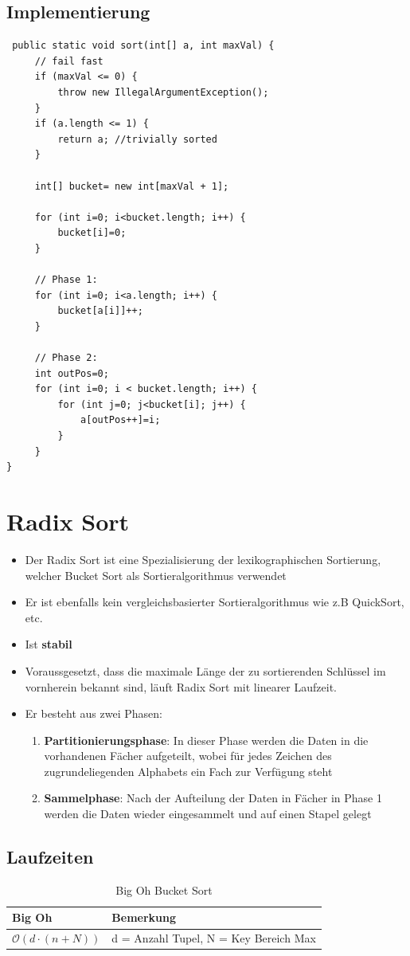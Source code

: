 \subsection{Implementierung}
\begin{lstlisting}
 public static void sort(int[] a, int maxVal) {
	 // fail fast
	 if (maxVal <= 0) {
		 throw new IllegalArgumentException();
	 }
	 if (a.length <= 1) {
		 return a; //trivially sorted
	 }
 
	 int[] bucket= new int[maxVal + 1];
	
	 for (int i=0; i<bucket.length; i++) {
		 bucket[i]=0;
	 }
	
	 // Phase 1:
	 for (int i=0; i<a.length; i++) {
		 bucket[a[i]]++;
	 }
	
	 // Phase 2: 
	 int outPos=0;
	 for (int i=0; i < bucket.length; i++) {
		 for (int j=0; j<bucket[i]; j++) {
			 a[outPos++]=i;
		 }
	 }
}
\end{lstlisting}

\clearpage


\section{Radix Sort}
\begin{itemize}
	\item Der Radix Sort ist eine Spezialisierung der lexikographischen Sortierung, welcher Bucket Sort als Sortieralgorithmus verwendet
	\item Er ist ebenfalls kein vergleichsbasierter Sortieralgorithmus wie z.B QuickSort, etc.
	\item Ist \textbf{stabil}
	\item Voraussgesetzt, dass die maximale Länge der zu sortierenden Schlüssel im vornherein bekannt sind, läuft Radix Sort mit linearer Laufzeit.
	\item Er besteht aus zwei Phasen:
	\begin{enumerate}
		\item \textbf{Partitionierungsphase}: In dieser Phase werden die Daten in die vorhandenen Fächer aufgeteilt, wobei für jedes Zeichen des zugrundeliegenden Alphabets ein Fach zur Verfügung steht
		\item \textbf{Sammelphase}: Nach der Aufteilung der Daten in Fächer in Phase 1 werden die Daten wieder eingesammelt und auf einen Stapel gelegt
	\end{enumerate}
\end{itemize}

\subsection{Laufzeiten}
\begin{table}[h]
	\centering
	\begin{tabu} to \linewidth {l l}
		\toprule
		Big Oh & Bemerkung \\
		\midrule
		$\mathcal{O}(d \cdot (n+N))$ & d = Anzahl Tupel, N = Key Bereich Max\\
		\bottomrule
	\end{tabu}
	\caption{Big Oh Bucket Sort}
\end{table}

